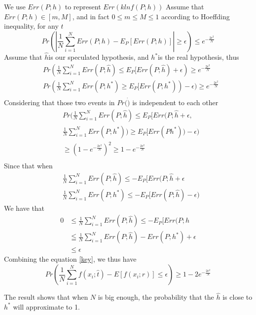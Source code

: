 \documentclass[10pt,conference,compsocconf,letterpaper]{IEEEtran}
\begin{document}
\begin{IEEEproof}
We use $Err(P;h)$ to represent $Err(klnf(P;h))$ Assume that $Err(P;h)\in[m,M]$, and in fact $0\leq m\leq M\leq 1$
according to Hoeffding inequality, for any $t$
\begin{equation*}
Pr(|\frac{1}{N}\sum_{i=1}^NErr(P;h)-E_P[Err(P;h)]|\geq \epsilon)\leq e^{-\frac{2\epsilon^2}{N}}
\end{equation*}
Assume that $\hat{h}$is our speculated hypothesis, and $h^*$is the real hypothesis, thus
\begin{equation*}
\begin{aligned}
&Pr(\frac{1}{N}\sum_{i=1}^NErr(P;\hat{h})\leq E_P[Err(P;\hat{h})+\epsilon)\geq e^{-\frac{2\epsilon^2}{N}}\\
&Pr(\frac{1}{N}\sum_{i=1}^NErr(P;h^*)\geq E_P[Err(P;h^*))-\epsilon)\geq e^{-\frac{2\epsilon^2}{N}}\\
\end{aligned}
\end{equation*}
Considering that those two events in $Pr(\dot)$ is independent to each other
\begin{equation*}\label{key}
\begin{aligned}
&Pr(\frac{1}{N}\sum_{i=1}^NErr(P;\hat{h})\leq E_P[Err(P;\hat{h}+\epsilon,\\
&\frac{1}{N}\sum_{i=1}^NErr(P;h^*))\geq E_P[Err(Ph^*))-\epsilon)\\
&\geq(1-e^{-\frac{2\epsilon^2}{N}})^2\geq 1-e^{-\frac{2\epsilon^2}{N}}\\
\end{aligned}
\end{equation*}
Since that when
\begin{equation*}
\begin{aligned}
&\frac{1}{N}\sum_{i=1}^NErr(P;\hat{h})\leq -E_P[Err(P;\hat{h}+\epsilon\\
&\frac{1}{N}\sum_{i=1}^NErr(P;h^*)\leq -E_P[Err(P;\hat{h})-\epsilon)
\end{aligned}
\end{equation*}
We have that
\begin{equation*}
\begin{aligned}
0&\leq\frac{1}{N}\sum_{i=1}^NErr(P;\hat{h})\leq -E_P[Err(P;\hat{h}\\
&\leqq\frac{1}{N}\sum_{i=1}^NErr(P;\hat{h})-Err(P;h^*)+\epsilon\\
&\leq\epsilon
\end{aligned}
\end{equation*}
Combining the equation \ref{key}, we thus have
\begin{equation}
Pr(\frac{1}{N}\sum_{i=1}^Nf(x_i;\hat{t})-E[f(x_i;r)]\leq\epsilon)\geq1-2e^{-\frac{2\epsilon^2}{N}}
\end{equation}
\end{IEEEproof}
The result shows that when $N$ is big enough, the probability that the $\hat{h}$ is close to $h^*$ will approximate to 1.
\end{document}
